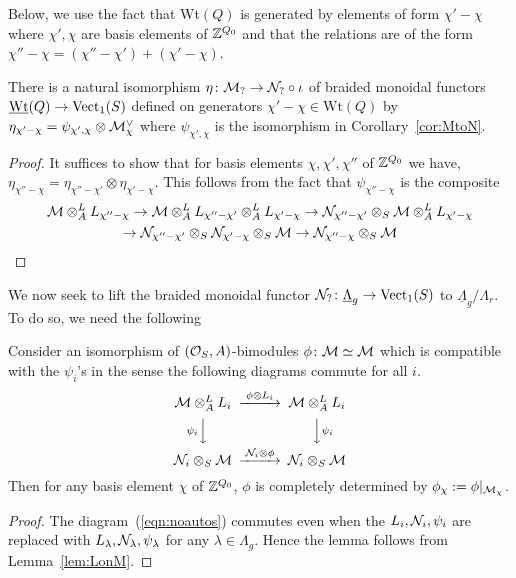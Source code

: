 \documentclass[12pt]{amsart}
\begin{document}
Below, we use the fact that Wt$(Q)$ is generated by elements of form $\chi'-\chi$ where $\chi',\chi$ are basis elements of $\mathbb{Z}^{Q_0}$ and that the relations are of the form $\chi'' - \chi = (\chi'' - \chi') + (\chi' - \chi)$. 
\begin{proposition}  \label{prop:MtoN}
There is a natural isomorphism $\eta \colon \mathcal{M}_? \to \mathcal{N}_?\circ \iota$ of braided monoidal functors $\underline{\text{Wt}}(Q) \to \operatorname{Vect}_1(S)$ defined on generators $\chi'-\chi \in \text{Wt}(Q)$ by $\eta_{\chi'-\chi} = \psi_{\chi',\chi} \otimes \mathcal{M}_{\chi}^{\vee}$
where $\psi_{\chi',\chi}$ is the isomorphism in Corollary~\ref{cor:MtoN}.
\end{proposition}
\begin{proof}
It suffices to show that for basis elements $\chi,\chi', \chi''$ of $\mathbb{Z}^{Q_0}$ we have, $\eta_{\chi''-\chi} = \eta_{\chi''-\chi'} \otimes \eta_{\chi'-\chi}$. This follows from the fact that $\psi_{\chi''-\chi}$ is the composite
\begin{multline*} \mathcal{M}\otimes_A^L L_{\chi''-\chi} \to \mathcal{M} \otimes_A^L L_{\chi''-\chi'} \otimes_A^L L_{\chi'-\chi} \to \mathcal{N}_{\chi''-\chi'} \otimes_S \mathcal{M} \otimes_A^L L_{\chi'-\chi} \\
\to \mathcal{N}_{\chi''-\chi'} \otimes_S \mathcal{N}_{\chi'-\chi} \otimes_S\mathcal{M} \to \mathcal{N}_{\chi''-\chi} \otimes_S \mathcal{M}
\end{multline*}
\end{proof}
We now seek to lift the braided monoidal functor $\mathcal{N}_?\colon \underline{\Lambda}_g \to \operatorname{Vect}_1(S)$ to $\underline{\Lambda}_g/\Lambda_r$. To do so, we need the following
\begin{lemma}  \label{lem:noautos}
Consider an isomorphism of $(\mathcal{O}_S,A)$-bimodules $\phi \colon \mathcal{M} \simeq \mathcal{M}$ which is compatible with the $\psi_i$'s in the sense the following diagrams commute for all $i$.
\begin{equation}  \label{eqn:noautos}
\begin{CD}
\cM \otimes_A^L L_i @>{\phi\otimes L_i}>> \cM\otimes_A^L L_i \\
@V{\psi_i}VV @VV{\psi_i}V \\
\cN_i \otimes_S \cM @>{\cN_i \otimes \phi}>> \cN_i \otimes_S \cM
\end{CD}
\end{equation}
Then  for any basis element $\chi$ of $\mathbb{Z}^{Q_0}$, $\phi$ is completely determined by $\phi_{\chi}:= \phi|_{\mathcal{M}_{\chi}}$.
\end{lemma}
\begin{proof}
The diagram~(\ref{eqn:noautos}) commutes even when the $L_i,\mathcal{N}_i,\psi_i$ are replaced with $L_{\lambda},\mathcal{N}_{\lambda},\psi_{\lambda}$ for any $\lambda \in \Lambda_g$. Hence the lemma follows from Lemma~\ref{lem:LonM}. 
\end{proof}
\end{document}
